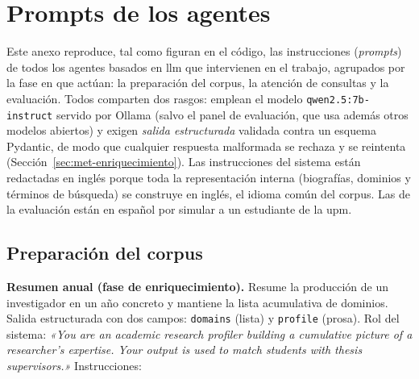 \chapter{Prompts de los agentes}
\label{annex:prompts}

Este anexo reproduce, tal como figuran en el código, las instrucciones (\emph{prompts}) de todos los agentes basados en \gls{llm} que intervienen en el trabajo, agrupados por la fase en que actúan: la preparación del corpus, la atención de consultas y la evaluación.
Todos comparten dos rasgos: emplean el modelo \texttt{qwen2.5:\allowbreak7b-instruct} servido por Ollama (salvo el panel de evaluación, que usa además otros modelos abiertos) y exigen \emph{salida estructurada} validada contra un esquema Pydantic, de modo que cualquier respuesta malformada se rechaza y se reintenta (Sección~\ref{sec:met-enriquecimiento}).
Las instrucciones del sistema están redactadas en inglés porque toda la representación interna (biografías, dominios y términos de búsqueda) se construye en inglés, el idioma común del corpus.
Las de la evaluación están en español por simular a un estudiante de la \gls{upm}.

\section*{Preparación del corpus}

\textbf{Resumen anual (fase de enriquecimiento).}
Resume la producción de un investigador en un año concreto y mantiene la lista acumulativa de dominios.
Salida estructurada con dos campos: \texttt{domains} (lista) y \texttt{profile} (prosa).
Rol del sistema: \emph{«You are an academic research profiler building a cumulative picture of a researcher's expertise. Your output is used to match students with thesis supervisors.»}
Instrucciones:

